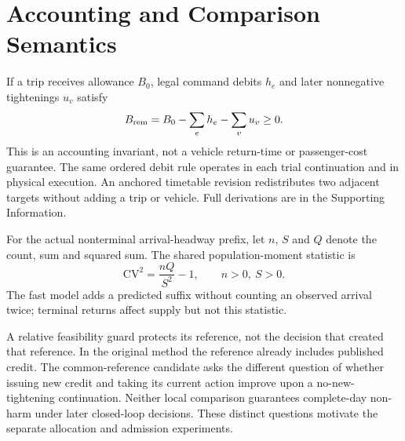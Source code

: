 \section{Accounting and Comparison Semantics}
\label{sec:properties}
If a trip receives allowance $B_0$, legal command debits $h_e$ and later
nonnegative tightenings $u_v$ satisfy
\begin{equation}
 B_{\rm rem}=B_0-\sum_eh_e-\sum_vu_v\geq0.
 \label{eq:budget_identity}
\end{equation}
This is an accounting invariant, not a vehicle return-time or passenger-cost
guarantee. The same ordered debit rule operates in each trial continuation and
in physical execution. An anchored timetable revision redistributes two
adjacent targets without adding a trip or vehicle. Full derivations are in the
Supporting Information.

For the actual nonterminal arrival-headway prefix, let $n$, $S$ and $Q$ denote
the count, sum and squared sum. The shared population-moment statistic is
\begin{equation}
 \mathrm{CV}^2=\frac{nQ}{S^2}-1,\qquad n>0,\ S>0.
 \label{eq:cv_moments}
\end{equation}
The fast model adds a predicted suffix without counting an observed arrival
twice; terminal returns affect supply but not this statistic.

A relative feasibility guard protects its reference, not the decision that
created that reference. In the original method the reference already includes
published credit. The common-reference candidate asks the different question
of whether issuing new credit and taking its current action improve upon a
no-new-tightening continuation. Neither local comparison guarantees complete-day
non-harm under later closed-loop decisions. These distinct questions motivate
the separate allocation and admission experiments.
